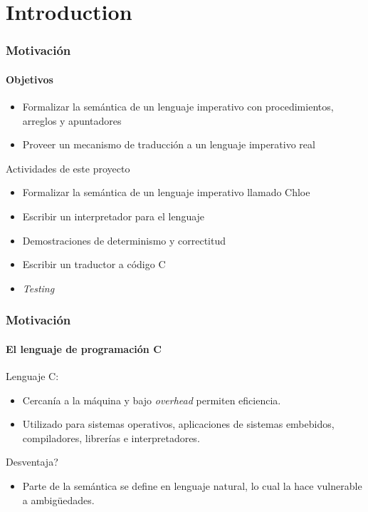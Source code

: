 \section{Introduction}

\begin{frame}
\frametitle{Motivación}
\framesubtitle{Objetivos}

\begin{itemize}
\item{Formalizar la semántica de un lenguaje imperativo con procedimientos, arreglos y apuntadores}
\item{Proveer un mecanismo de traducción a un lenguaje imperativo real}
\end{itemize}

\pause

Actividades de este proyecto
\begin{itemize}
\item{Formalizar la semántica de un lenguaje imperativo llamado Chloe}
\item{Escribir un interpretador para el lenguaje}
\item{Demostraciones de determinismo y correctitud}
\item{Escribir un traductor a código C}
\item{\textit{Testing}}
\end{itemize}

\end{frame}

\begin{frame}
\frametitle{Motivación}
\framesubtitle{El lenguaje de programación C}

\pause

Lenguaje C:

\pause

\begin{itemize}
\item{Cercanía  a la máquina y bajo \textit{overhead} permiten eficiencia.}
\pause
\item{Utilizado para sistemas operativos, aplicaciones de sistemas embebidos, compiladores, librerías e interpretadores.}
\pause
\end{itemize}

Desventaja?
\pause
\begin{itemize}
\item{Parte de la semántica se define en lenguaje natural, lo cual la hace vulnerable a ambigüedades.}
\end{itemize}

\end{frame}


